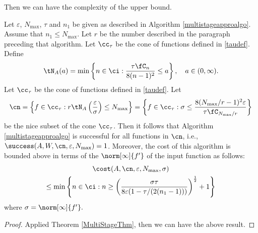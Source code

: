 Then we can have the complexity of the upper bound.
\begin{theorem}   Let  $\varepsilon$, $N_{\max}$, $\tau$ and $n_1$ be given as described in Algorithm \ref{multistageapproalgo}.
Assume that $n_1 \le N_{\max}$. Let $r$ be the number described in the paragraph preceding that algorithm.
Let $\cc_\tau$ be the cone of functions defined in \eqref{taudef}.
Define
\[
\tN_A(a) = \min\left\{ n \in \ci : \frac{\tau \fC_n }{8(n-1)^2} \le a \right\}, \quad a \in (0,\infty).
\]
Let $\cc_\tau$ be the cone of functions defined in \eqref{taudef}.  Let
$$
\cn = \left \{ f \in \cc_\tau :r\tN_{A}\left(\frac{\varepsilon}{\sigma} \right) \le N_{\max} \right\}
= \left \{ f \in \cc_\tau : \sigma \le \frac{8(N_{\max}/r-1)^2 \varepsilon }{\tau \fC_{N_{\max}/r}  } \right\}
$$
be the nice subset of the cone $\cc_\tau$.  Then it follows that Algorithm \ref{multistageapproalgo} is successful for all functions in $\cn$,  i.e.,  $\success(A,W,\cn,\varepsilon,N_{\max}) = 1$.  Moreover, the cost of this algorithm is bounded above in terms of the $\norm[\infty]{f'}$ of the input function as follows:
\begin{multline}
\cost(A,\cn,\varepsilon,N_{\max},\sigma) \\
\le  \min\left\{ n \in \ci : n \ge \left(\frac{\sigma\tau}{8\varepsilon(1 - \tau/(2(n_{1}-1)))}\right)^{\frac{1}{2}} +1\right\}
\end{multline} where $\sigma=\norm[\infty]{f'}.$
\end{theorem}

\begin{proof}
Applied Theorem \ref{MultiStageThm}, then we can have the above result.
\end{proof}




